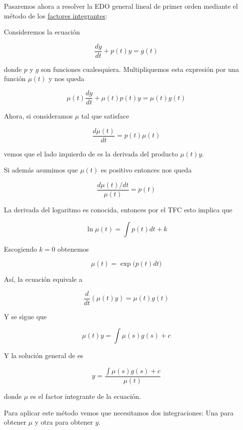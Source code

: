 Pasaremos ahora a resolver la EDO general lineal de primer orden mediante el método de los \ul{factores integrantes}:

Consideremos la ecuación

\begin{equation}\label{eq:met_integrantes1}
    \frac{dy}{dt} + p(t)y = g(t)
\end{equation}

donde $p$ y $g$ son funciones cualesquiera. Multipliquemos esta expresión por una función $\mu(t)$ y nos queda

\begin{equation}\label{eq:met_integrantes2}
    \mu(t)\frac{dy}{dt} + \mu(t)p(t)y = \mu(t)g(t)
\end{equation}

Ahora, si consideramos $\mu$ tal que satisface

\begin{equation}\label{eq:met_integrantes3}
    \frac{d\mu(t)}{dt} = p(t)\mu(t)
\end{equation}

vemos que el lado izquierdo de  es la derivada del producto $\mu(t)y$.

Si además asumimos que $\mu(t)$ es positivo entonces nos queda

\[
    \frac{d\mu(t)/dt}{\mu(t)} = p(t)
\]

La derivada del logaritmo es conocida, entonces por el TFC esto implica que

\[
    \ln\mu(t) = \int p(t)dt + k
\]

Escogiendo $k = 0$ obtenemos

\[
    \mu(t) = \exp \big( p(t)dt \big)
\]

Así, la ecuación  equivale a

\[
    \frac{d}{dt}(\mu(t)y) = \mu(t)g(t)
\]

Y se sigue que

\[
    \mu(t)y = \int \mu(s)g(s) + c
\]

Y la solución general de  es

\[
    y = \displaystyle \frac{\int \mu(s)g(s) + c}{\mu(t)}
\]

donde $\mu$ es el factor integrante de la ecuación.

Para aplicar este método vemos que necesitamos dos integraciones: Una para obtener $\mu$ y otra para obtener $y$.